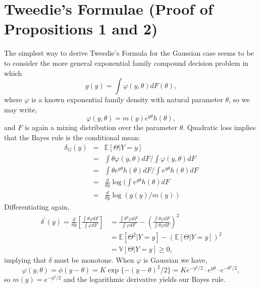 \documentclass[12pt]{amsart}
\def\EB{\mathbb{E}}
\def\VB{\mathbb{V}}
\begin{document}

\appendix
{\footnotesize
\section{Tweedie's Formulae (Proof of Propositions 1 and 2)} 
The simplest way to derive Tweedie's Formula for the Gaussian case seems to 
be to consider the more general exponential family compound decision problem 
in which
\[
g (y) = \int \varphi(y , \theta) dF(\theta),
\]
where $\varphi$ is a known exponential family density with natural parameter
$\theta$, so we may write,
\[
\varphi (y , \theta ) = m(y) e^{y \theta} h(\theta),
\]
and $F$ is again a mixing distribution over the parameter $\theta$.
Quadratic loss implies that the Bayes rule is the conditional mean:
\begin{eqnarray*}
\delta_G (y) & = & \EB [ \Theta | Y = y]\\
&=& \int \theta \varphi(y,\theta) dF / \int  \varphi(y,\theta) dF\\
&=& \int \theta e^{y \theta} h(\theta) dF / \int e^{y \theta} h(\theta) dF \\
&=& \frac{d}{dy} \log ( \int  e^{y \theta} h(\theta) dF \\
&=& \frac{d}{dy} \log ( g(y) /m(y)) 
\end{eqnarray*}
Differentiating again,
\begin{align*}
\delta^\prime (y) = \frac{d}{dy} 
\left [ \frac { \int \theta \varphi dF } { \int \varphi dF } \right ]
& =  \frac { \int \theta^2 \varphi dF } { \int \varphi dF } 
 - \left ( \frac { \int \theta \varphi dF } { \int \theta \varphi dF } \right )^2 \\
& =  \EB [ \Theta^2 | Y = y] - (\EB [ \Theta | Y = y])^2\\
& =  \VB [ \Theta | Y = y] \geq 0,
\end{align*}
implying that $\delta$ must be monotone.  
When $\varphi$ is Gaussian we have,
\[
\varphi (y, \theta) = \phi(y - \theta) = K \exp \{ - (y - \theta)^2 / 2 \}
= K  e^{-y^2/2} \cdot e^{y \theta} \cdot e^{- \theta^2 /2}, 
\]
so $m(y) = e^{-y^2/2} $ and the logarithmic derivative yields our Bayes rule.

}
\end{document}
